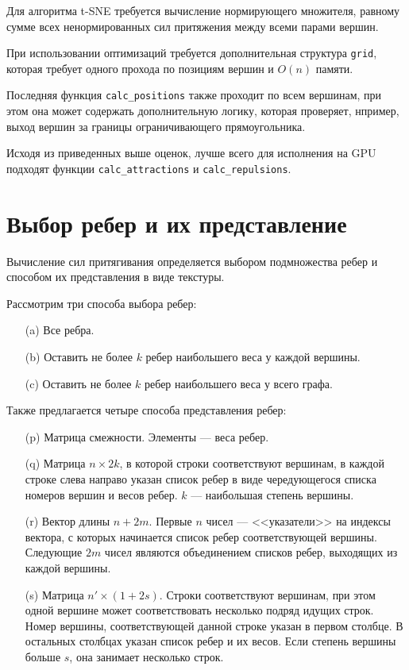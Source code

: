 Для алгоритма t-SNE требуется вычисление нормирующего множителя, равному сумме всех ненормированных сил притяжения между всеми парами вершин. 

При использовании оптимизаций требуется дополнительная структура \texttt{grid}, которая требует одного прохода по позициям вершин и $O(n)$ памяти.

Последняя функция \texttt{calc\_positions} также проходит по всем вершинам, при этом она может содержать дополнительную логику, которая проверяет, нпример, выход вершин за границы ограничивающего прямоугольника.

Исходя из приведенных выше оценок, лучше всего для исполнения на GPU подходят функции \texttt{calc\_attractions} и \texttt{calc\_repulsions}.

\section{Выбор ребер и их представление}

Вычисление сил притягивания определяется выбором подмножества ребер и способом их представления в виде текстуры.

Рассмотрим три способа выбора ребер:
\begin{itemize}
\item[(a)] Все ребра.
\item[(b)] Оставить не более $k$ ребер наибольшего веса у каждой вершины.
\item[(c)] Оставить не более $k$ ребер наибольшего веса у всего графа.
\end{itemize}

Также предлагается четыре способа представления ребер:
\begin{itemize}
\item[(p)] Матрица смежности. Элементы --- веса ребер.
\item[(q)] Матрица $n\times 2k$, в которой строки соответствуют вершинам, в каждой строке слева направо указан список ребер в виде чередующегося списка номеров вершин и весов ребер. $k$ --- наибольшая степень вершины.
\item[(r)] Вектор длины $n + 2m$. Первые $n$ чисел --- <<указатели>> на индексы вектора, с которых начинается список ребер соответствующей вершины. Следующие $2m$ чисел являются объединением списков ребер, выходящих из каждой вершины.
\item[(s)] Матрица $n'\times (1 + 2s)$. Строки соответствуют вершинам, при этом одной вершине может соответствовать несколько подряд идущих строк. Номер вершины, соответствующей данной строке указан в первом столбце. В остальных столбцах указан список ребер и их весов. Если степень вершины больше $s$, она занимает несколько строк.
\end{itemize}

